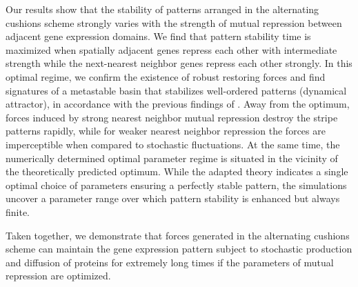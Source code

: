 \documentclass[a4paper,10pt]{article}
\newcommand{\mysubsubsection}[1]{\vspace{1EM}\noindent{\bf #1}\\}
\begin{document}
Our results show that the stability of patterns arranged in the alternating cushions scheme strongly varies with the strength of mutual repression between adjacent gene expression domains. 
We find that pattern stability time is maximized when spatially adjacent genes repress each other with intermediate strength while the next-nearest neighbor genes repress each other strongly. 
In this optimal regime, we confirm the existence of robust restoring forces and find signatures of a metastable basin that stabilizes well-ordered patterns (dynamical attractor), in accordance with the previous findings of \cite{Vakulenko2009}.
Away from the optimum, forces induced by strong nearest neighbor mutual repression destroy the stripe patterns rapidly, while for weaker nearest neighbor repression the forces are imperceptible when compared to stochastic fluctuations. At the same time, the numerically determined optimal parameter regime is situated in the vicinity of the theoretically predicted optimum. While the adapted theory indicates a single optimal choice of parameters ensuring a perfectly stable pattern, the simulations uncover a parameter range over which pattern stability is enhanced but always finite.%

Taken together, we demonstrate that forces generated in the alternating cushions scheme can maintain the gene expression pattern subject to stochastic production and diffusion of proteins for extremely long times if the parameters of mutual repression are optimized.

\mysubsubsection{Modelling framework}
\end{document}
